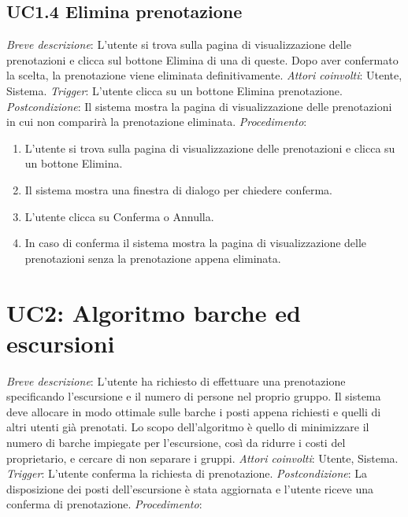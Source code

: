 \subsection{UC1.4 Elimina prenotazione}
\noindent \emph{Breve descrizione}: L'utente si trova sulla pagina di visualizzazione delle prenotazioni e clicca sul bottone Elimina di una di queste. Dopo aver confermato la scelta, la prenotazione viene eliminata definitivamente.\medbreak
\noindent \emph{Attori coinvolti}: Utente, Sistema.\medbreak
\noindent \emph{Trigger}: L'utente clicca su un bottone Elimina prenotazione.\medbreak
\noindent \emph{Postcondizione}: Il sistema mostra la pagina di visualizzazione delle prenotazioni in cui non comparirà la prenotazione eliminata.\medbreak
\noindent \emph{Procedimento}:

\begin{enumerate}
    \item L'utente si trova sulla pagina di visualizzazione delle prenotazioni e clicca su un bottone Elimina.
    \item Il sistema mostra una finestra di dialogo per chiedere conferma.
    \item L'utente clicca su Conferma o Annulla.
    \item In caso di conferma il sistema mostra la pagina di visualizzazione delle prenotazioni senza la prenotazione appena eliminata.
\end{enumerate}

\section{UC2: Algoritmo barche ed escursioni}
\noindent \emph{Breve descrizione}: L'utente ha richiesto di effettuare una prenotazione specificando l'escursione e il numero di persone nel proprio gruppo. Il sistema deve allocare in modo ottimale sulle barche i posti appena richiesti e quelli di altri utenti già prenotati. Lo scopo dell'algoritmo è quello di minimizzare il numero di barche impiegate per l'escursione, così da ridurre i costi del proprietario, e cercare di non separare i gruppi.\medbreak
\noindent \emph{Attori coinvolti}: Utente, Sistema.\medbreak
\noindent \emph{Trigger}: L'utente conferma la richiesta di prenotazione.\medbreak
\noindent \emph{Postcondizione}: La disposizione dei posti dell'escursione è stata aggiornata e l'utente riceve una conferma di prenotazione.\medbreak
\noindent \emph{Procedimento}:

